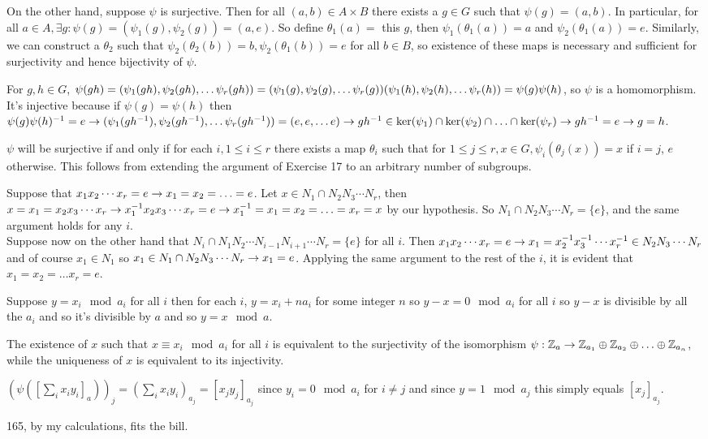 \documentclass[11pt, oneside]{article}   	%
\begin{document}
On the other hand, suppose $\psi$ is surjective. Then for all $(a, b) \in A \times B$ there exists a $g \in G$ such that $\psi(g) = (a, b)$. In particular, for all $a \in A, \exists g : \psi(g) = (\psi_1(g), \psi_2(g)) = (a, e)$. So define $\theta_1(a) = $ this $g$, then $\psi_1(\theta_1(a)) = a$ and $\psi_2(\theta_1(a)) = e$. Similarly, we can construct a $\theta_2$ such that $\psi_2(\theta_2(b)) = b, \psi_2(\theta_1(b)) = e$ for all $b \in B$, so existence of these maps is necessary and sufficient for surjectivity and hence bijectivity of $\psi$.
\item \be
\item For $g, h \in G$, $\psi(gh) = (\psi_1(gh), \psi_2(gh), \ldots \psi_r(gh)) \\
= (\psi_1(g), \psi_2(g), \ldots \psi_r(g))(\psi_1(h), \psi_2(h), \ldots \psi_r(h)) = \psi(g)\psi(h)$, so $\psi$ is a homomorphism. It's injective because if $\psi(g) = \psi(h)$ then $\psi(g)\psi(h)^{-1} = e \rightarrow (\psi_1(gh^{-1}), \psi_2(gh^{-1}), \ldots \psi_r(gh^{-1})) = (e, e, \ldots e) \rightarrow gh^{-1} \in \ker(\psi_1) \cap \ker(\psi_2) \cap \ldots \cap \ker(\psi_r) \rightarrow gh^{-1} = e \rightarrow g = h$.
\item $\psi$ will be surjective if and only if for each $i, 1 \le i \le r$ there exists a map $\theta_i$ such that for $1 \le j \le r, x \in G, \psi_i(\theta_j(x)) = x$ if $i = j$, $e$ otherwise. This follows from extending the argument of Exercise 17 to an arbitrary number of subgroups.
\ee
\item Suppose that $x_1x_2\cdots x_r = e \rightarrow x_1 = x_2 = \ldots = e$. Let $x \in N_1 \cap N_2N_3 \cdots N_r$, then $x = x_1 = x_2x_3\cdots x_r \rightarrow x_1^{-1} x_2x_3 \cdots x_r = e \rightarrow x_1^{-1} = x_1 = x_2 = \ldots = x_r =x $ by our hypothesis. So $N_1 \cap N_2N_3 \cdots N_r = \{e\}$, and the same argument holds for any $i$. \\
Suppose now on the other hand that $N_i \cap N_1N_2\cdots N_{i-1}N_{i + 1}\cdots N_r = \{e\}$ for all $i$. Then $x_1x_2\cdots x_r = e \rightarrow x_1 = x_2^{-1} x_3^{-1} \cdots x_r^{-1} \in N_2N_3\cdots N_r$ and of course $x_1 \in N_1$ so $x_1 \in N_1 \cap N_2N_3 \cdots N_r \rightarrow x_1 = e$. Applying the same argument to the rest of the $i$, it is evident that $x_1 = x_2 = \ldots x_r = e$. 
\item Suppose $y = x_i \mod a_i$ for all $i$ then for each $i$, $y = x_i + na_i$ for some integer $n$ so $y - x = 0 \mod a_i$ for all $i$ so $y - x$ is divisible by all the $a_i$ and so it's divisible by $a$ and so $y = x \mod a$.
\item The existence of $x$ such that $x \equiv x_i \mod a_i$ for all $i$ is equivalent to the surjectivity of the isomorphism $\psi: \mathbb{Z}_a \rightarrow \mathbb{Z}_{a_1} \oplus \mathbb{Z}_{a_2} \oplus \ldots \oplus \mathbb{Z}_{a_n}$, while the uniqueness of $x$ is equivalent to its injectivity.
\item $(\psi([\sum_i x_iy_i]_a))_j = (\sum_i x_iy_i)_{a_j} = [x_jy_j]_{a_j}$ since $y_i = 0 \mod a_i$ for $i \not = j$ and since $y = 1 \mod a_j$ this simply equals $[x_j]_{a_j}$. 
\item 165, by my calculations, fits the bill.
\ee
\end{document}
